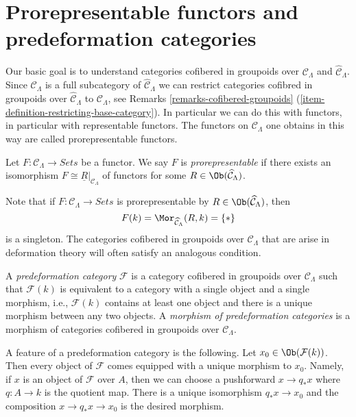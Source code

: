 \section{Prorepresentable functors and predeformation categories}
\label{section-cofibered-groupoids}

\noindent
Our basic goal is to understand categories cofibered in groupoids over
$\mathcal{C}_\Lambda$ and $\widehat{\mathcal{C}}_\Lambda$. Since
$\mathcal{C}_\Lambda$ is a full subcategory of
$\widehat{\mathcal{C}}_\Lambda$ we can restrict categories cofibred in
groupoids over $\widehat{\mathcal{C}}_\Lambda$ to $\mathcal{C}_\Lambda$, see
Remarks \ref{remarks-cofibered-groupoids}
(\ref{item-definition-restricting-base-category}).
In particular we can do this with functors, in particular with
representable functors. The functors on $\mathcal{C}_\Lambda$
one obtains in this way are called
prorepresentable functors.

\begin{definition}
\label{definition-prorepresentable}
Let $F : \mathcal{C}_\Lambda \to \textit{Sets}$ be a functor.
We say $F$ is {\it prorepresentable} if there exists an isomorphism
$F \cong \underline{R}|_{\mathcal{C}_\Lambda}$ of functors for some
$R \in \Ob(\widehat{\mathcal{C}}_\Lambda)$.
\end{definition}

\noindent
Note that if $F : \mathcal{C}_\Lambda \to \textit{Sets}$ is prorepresentable
by $R \in \Ob(\widehat{\mathcal{C}}_\Lambda)$, then
$$
F(k) = \Mor_{\widehat{\mathcal{C}}_\Lambda}(R, k) = \{*\}
$$
is a singleton. The categories cofibered in groupoids over
$\mathcal{C}_\Lambda$ that are arise in deformation theory will often satisfy
an analogous condition.

\begin{definition}
\label{definition-predeformation-category}
A {\it predeformation category} $\mathcal{F}$ is a category cofibered
in groupoids over $\mathcal{C}_\Lambda$ such that $\mathcal{F}(k)$ is
equivalent to a category with a single object and a single morphism,
i.e., $\mathcal{F}(k)$ contains at least one object and there is a
unique morphism between any two objects. A {\it morphism of predeformation
categories} is a morphism of categories cofibered in groupoids over
$\mathcal{C}_\Lambda$.
\end{definition}

\noindent
A feature of a predeformation category is the following.
Let $x_0 \in \Ob(\mathcal{F}(k))$. Then every object of
$\mathcal{F}$ comes equipped with a unique morphism to $x_0$.
Namely, if $x$ is an object of $\mathcal{F}$ over $A$, then we
can choose a pushforward $x \to q_*x$ where $q : A \to k$ is the quotient
map. There is a unique isomorphism $q_*x \to x_0$ and the composition
$x \to q_*x \to x_0$ is the desired morphism.

